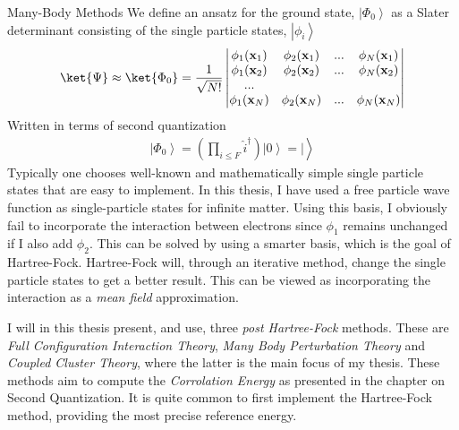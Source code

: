 \documentclass[twoside,english]{uiofysmaster}
\begin{document}
\begin{chapter}{Many-Body Methods}
	We define an ansatz for the ground state, $\left| \Phi_0 \right>$ as a Slater determinant consisting of the single particle states, $\left| \phi_i \right>$
	\begin{align}
		\ket{\Psi} \approx \ket{\Phi_0} = 	\frac{1}{ \sqrt{N!} } \left|\begin{matrix}
			\phi_1(\mathbf{x}_1) & \phi_2(\mathbf{x}_1) & ... & \phi_N(\mathbf{x}_1) \\
			\phi_1(\mathbf{x}_2) & \phi_2(\mathbf{x}_2) & ... & \phi_N(\mathbf{x}_2) \\
			... & & & \\
			\phi_1(\mathbf{x}_N) & \phi_2(\mathbf{x}_N) & ... & \phi_N(\mathbf{x}_N) 
		\end{matrix} \right|
	\end{align}
	Written in terms of second quantization
	\begin{align}
		\left| \Phi_0 \right> = \left( \prod_{i \leq F} \hat i^\dagger \right) \left| 0 \right> = |\left.  \right> 
	\end{align}
	Typically one chooses well-known and mathematically simple single particle states that are easy to implement. In this thesis, I have used a free particle wave function as single-particle states for infinite matter. Using this basis, I obviously fail to incorporate the interaction between electrons since $\phi_1$ remains unchanged if I also add $\phi_2$. This can be solved by using a smarter basis, which is the goal of Hartree-Fock. Hartree-Fock will, through an iterative method, change the single particle states to get a better result. This can be viewed as incorporating the interaction as a \textit{mean field} approximation. 

	I will in this thesis present, and use, three \textit{post Hartree-Fock} methods. These are \textit{Full Configuration Interaction Theory}, \textit{Many Body Perturbation Theory} and \textit{Coupled Cluster Theory}, where the latter is the main focus of my thesis. These methods aim to compute the \textit{Corrolation Energy} as presented in the chapter on Second Quantization. It is quite common to first implement the Hartree-Fock method, providing the most precise reference energy. 


\end{chapter}
\end{document}
